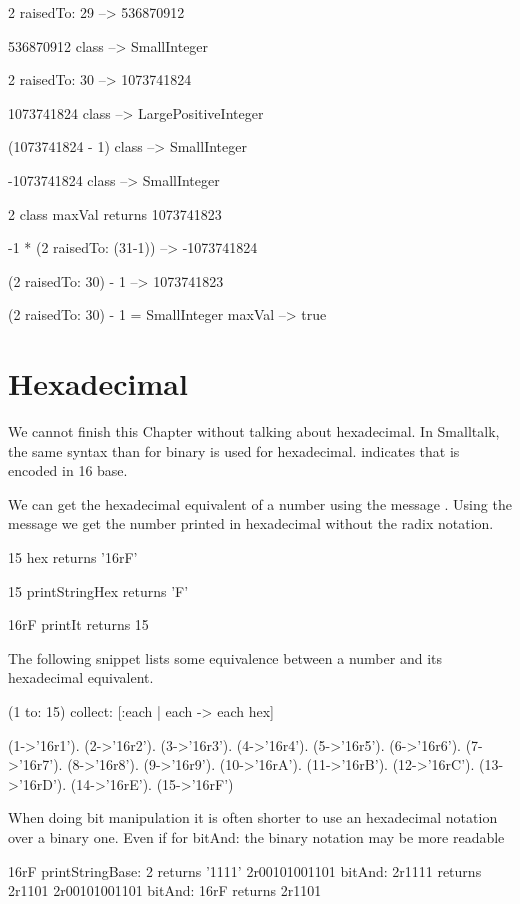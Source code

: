 \documentclass[a4paper,10pt,twoside]{book}
\begin{document}
\begin{code}{}
2 raisedTo: 29 
	--> 536870912 

536870912 class
	--> SmallInteger

2 raisedTo: 30 
	--> 1073741824

1073741824 class
	--> LargePositiveInteger
	
(1073741824 - 1) class
	--> SmallInteger

-1073741824 class 
	--> SmallInteger

2 class maxVal 
	returns 1073741823

-1 * (2 raisedTo: (31-1)) 
	--> -1073741824
	
(2 raisedTo: 30) - 1
	--> 1073741823
	
(2 raisedTo: 30) - 1 = SmallInteger maxVal	
	--> true
\end{code}







\section{Hexadecimal}
We cannot finish this Chapter without talking about hexadecimal. In Smalltalk, the same syntax than for binary is used for hexadecimal.  indicates that  is encoded in 16 base. 

We can get the hexadecimal equivalent of a number using the message . 
Using the message  we get the number printed in hexadecimal without the radix notation. 

\begin{code}{}
15 hex
	returns '16rF'
	
15 printStringHex 
	returns 'F'

16rF printIt
	returns 15
\end{code}

The following snippet lists some equivalence between a number and its hexadecimal equivalent.
\begin{code}
(1 to: 15) collect: [:each | each -> each hex] 

{(1->'16r1'). (2->'16r2'). (3->'16r3'). (4->'16r4'). (5->'16r5'). (6->'16r6'). (7->'16r7'). (8->'16r8'). (9->'16r9'). (10->'16rA'). (11->'16rB'). (12->'16rC'). (13->'16rD'). (14->'16rE'). (15->'16rF')}
\end{code}

When doing bit manipulation it is often shorter to use an hexadecimal notation over a binary one. Even if for bitAnd: the binary notation may be more readable
\begin{code}{}
16rF printStringBase: 2
	returns '1111'
2r00101001101 bitAnd: 2r1111	
	returns 2r1101
2r00101001101 bitAnd: 16rF
	returns 2r1101
\end{code}
\end{document}
